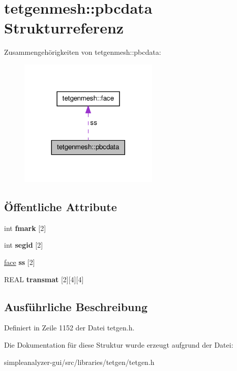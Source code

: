 \hypertarget{structtetgenmesh_1_1pbcdata}{\section{tetgenmesh\-:\-:pbcdata Strukturreferenz}
\label{structtetgenmesh_1_1pbcdata}
}


Zusammengehörigkeiten von tetgenmesh\-:\-:pbcdata\-:\nopagebreak
\begin{figure}[H]
\begin{center}
\leavevmode
\includegraphics[width=188pt]{structtetgenmesh_1_1pbcdata__coll__graph}
\end{center}
\end{figure}
\subsection*{Öffentliche Attribute}
\begin{DoxyCompactItemize}
\item 
\hypertarget{structtetgenmesh_1_1pbcdata_acc1dd0bfcf936c441db8ccca8a1c5a3e}{int {\bfseries fmark} \mbox{[}2\mbox{]}}\label{structtetgenmesh_1_1pbcdata_acc1dd0bfcf936c441db8ccca8a1c5a3e}

\item 
\hypertarget{structtetgenmesh_1_1pbcdata_aa4941205a4c69e9713e03655b57fff41}{int {\bfseries segid} \mbox{[}2\mbox{]}}\label{structtetgenmesh_1_1pbcdata_aa4941205a4c69e9713e03655b57fff41}

\item 
\hypertarget{structtetgenmesh_1_1pbcdata_ac3b5a295b2e682dc5f721f65c92826f4}{\hyperlink{classtetgenmesh_1_1face}{face} {\bfseries ss} \mbox{[}2\mbox{]}}\label{structtetgenmesh_1_1pbcdata_ac3b5a295b2e682dc5f721f65c92826f4}

\item 
\hypertarget{structtetgenmesh_1_1pbcdata_a7e7594665d51a5e4eb5752b8946fe229}{R\-E\-A\-L {\bfseries transmat} \mbox{[}2\mbox{]}\mbox{[}4\mbox{]}\mbox{[}4\mbox{]}}\label{structtetgenmesh_1_1pbcdata_a7e7594665d51a5e4eb5752b8946fe229}

\end{DoxyCompactItemize}


\subsection{Ausführliche Beschreibung}


Definiert in Zeile 1152 der Datei tetgen.\-h.



Die Dokumentation für diese Struktur wurde erzeugt aufgrund der Datei\-:\begin{DoxyCompactItemize}
\item 
simpleanalyzer-\/gui/src/libraries/tetgen/tetgen.\-h\end{DoxyCompactItemize}
